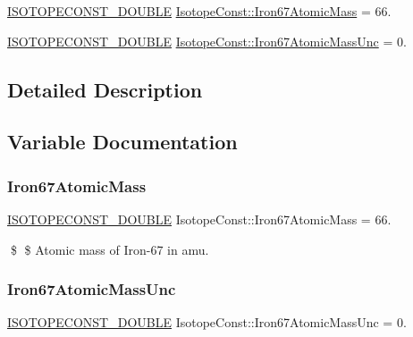 \begin{DoxyCompactItemize}
\item 
\mbox{\hyperlink{group___isotope_const-_macros_ga8f45a7272ce02c0b4c65c44636ed719a}{I\+S\+O\+T\+O\+P\+E\+C\+O\+N\+S\+T\+\_\+\+D\+O\+U\+B\+LE}} \mbox{\hyperlink{group___isotope_const-_iron-_fe67_ga2c5973a97d1629055ca55f0347542e83}{Isotope\+Const\+::\+Iron67\+Atomic\+Mass}} = 66.
\item 
\mbox{\hyperlink{group___isotope_const-_macros_ga8f45a7272ce02c0b4c65c44636ed719a}{I\+S\+O\+T\+O\+P\+E\+C\+O\+N\+S\+T\+\_\+\+D\+O\+U\+B\+LE}} \mbox{\hyperlink{group___isotope_const-_iron-_fe67_gab7badc485442262d55a0982cd67ab497}{Isotope\+Const\+::\+Iron67\+Atomic\+Mass\+Unc}} = 0.
\end{DoxyCompactItemize}


\subsection{Detailed Description}


\subsection{Variable Documentation}
\mbox{\label{group___isotope_const-_iron-_fe67_ga2c5973a97d1629055ca55f0347542e83}} 
\subsubsection{\texorpdfstring{Iron67\+Atomic\+Mass}{Iron67AtomicMass}}
{\footnotesize\ttfamily \mbox{\hyperlink{group___isotope_const-_macros_ga8f45a7272ce02c0b4c65c44636ed719a}{I\+S\+O\+T\+O\+P\+E\+C\+O\+N\+S\+T\+\_\+\+D\+O\+U\+B\+LE}} Isotope\+Const\+::\+Iron67\+Atomic\+Mass = 66.}

\$ \$ Atomic mass of Iron-\/67 in amu. \mbox{\label{group___isotope_const-_iron-_fe67_gab7badc485442262d55a0982cd67ab497}} 
\subsubsection{\texorpdfstring{Iron67\+Atomic\+Mass\+Unc}{Iron67AtomicMassUnc}}
{\footnotesize\ttfamily \mbox{\hyperlink{group___isotope_const-_macros_ga8f45a7272ce02c0b4c65c44636ed719a}{I\+S\+O\+T\+O\+P\+E\+C\+O\+N\+S\+T\+\_\+\+D\+O\+U\+B\+LE}} Isotope\+Const\+::\+Iron67\+Atomic\+Mass\+Unc = 0.}

